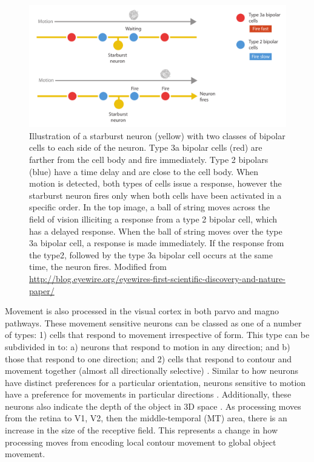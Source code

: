 \begin{figure}[t!]
\centering
\includegraphics[width=\textwidth]{images/related-work/starburst-neurons}
\caption{Illustration of a starburst neuron (yellow) with two classes of bipolar cells to each side of the neuron. 
Type 3a bipolar cells (red) are farther from the cell body and fire immediately. 
Type 2 bipolars (blue) have a time delay and are close to the cell body.
When motion is detected, both types of cells issue a response, however the starburst neuron fires only when both cells have been activated in a specific order.
In the top image, a ball of string moves across the field of vision illiciting a response from a type 2 bipolar cell, which has a delayed response.
When the ball of string moves over the type 3a bipolar cell, a response is made immediately.
If the response from the type2, followed by the type 3a bipolar cell occurs at the same time, the neuron fires.
Modified from \url{http://blog.eyewire.org/eyewires-first-scientific-discovery-and-nature-paper/}}
\label{fig:motion-neurons}
\end{figure}

Movement is also processed in the visual cortex in both parvo and magno pathways.
These movement sensitive neurons can be classed as one of a number of types: 1) cells that respond to movement irrespective of form. This type can be subdivided in to: a) neurons that respond to motion in any direction; and b) those that respond to one direction; and 2) cells that respond to contour and movement together (almost all directionally selective) \cite{Zeki01021974}.
Similar to how neurons have distinct preferences for a particular orientation, neurons sensitive to motion have a preference for movements in particular directions \cite{maunsell1983functional, dubner1971response, krug2012principles}.
Additionally, these neurons also indicate the depth of the object in 3D space \cite{maunsell1983functional, dubner1971response, krug2012principles}.
As processing moves from the retina to V1, V2, then the middle-temporal (MT) area, there is an increase in the size of the receptive field. 
This represents a change in how processing moves from encoding local contour movement to global object movement.


